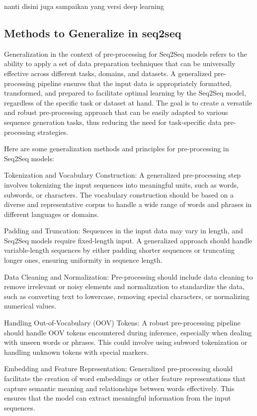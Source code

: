 \documentclass[conference]{IEEEtran}
\begin{document}
nanti disini juga sampaikan yang versi deep learning

\subsection{Methods to Generalize in seq2seq}

Generalization in the context of pre-processing for Seq2Seq models refers to the ability to apply a set of data preparation techniques that can be universally effective across different tasks, domains, and datasets. A generalized pre-processing pipeline ensures that the input data is appropriately formatted, transformed, and prepared to facilitate optimal learning by the Seq2Seq model, regardless of the specific task or dataset at hand. The goal is to create a versatile and robust pre-processing approach that can be easily adapted to various sequence generation tasks, thus reducing the need for task-specific data pre-processing strategies.

Here are some generalization methods and principles for pre-processing in Seq2Seq models:

    Tokenization and Vocabulary Construction: A generalized pre-processing step involves tokenizing the input sequences into meaningful units, such as words, subwords, or characters. The vocabulary construction should be based on a diverse and representative corpus to handle a wide range of words and phrases in different languages or domains.

    Padding and Truncation: Sequences in the input data may vary in length, and Seq2Seq models require fixed-length input. A generalized approach should handle variable-length sequences by either padding shorter sequences or truncating longer ones, ensuring uniformity in sequence length.

    Data Cleaning and Normalization: Pre-processing should include data cleaning to remove irrelevant or noisy elements and normalization to standardize the data, such as converting text to lowercase, removing special characters, or normalizing numerical values.

    Handling Out-of-Vocabulary (OOV) Tokens: A robust pre-processing pipeline should handle OOV tokens encountered during inference, especially when dealing with unseen words or phrases. This could involve using subword tokenization or handling unknown tokens with special markers.

    Embedding and Feature Representation: Generalized pre-processing should facilitate the creation of word embeddings or other feature representations that capture semantic meaning and relationships between words effectively. This ensures that the model can extract meaningful information from the input sequences.
\end{document}

